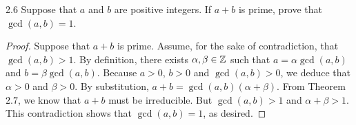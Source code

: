 \begin{exercise}{2.6}
    Suppose that \(a\) and \(b\) are positive integers. If \(a+b\) is prime, prove that \(\gcd(a,b) = 1\).
\end{exercise}
\begin{proof}
    Suppose that \(a + b\) is prime. Assume, for the sake of contradiction, that \(\gcd(a,b) > 1\).
    By definition, there exists \(\alpha, \beta \in \mathbb{Z}\) such that
    \(a = \alpha\gcd(a,b)\) and \(b = \beta\gcd(a,b)\). Because \(a > 0\), \(b > 0\) and \(\gcd(a,b) > 0\), we deduce
    that \(\alpha > 0\) and \(\beta > 0\). By substitution, \(a + b = \gcd(a,b)(\alpha + \beta)\).
    From Theorem \(2.7\), we know that \(a+b\) must be irreducible. But \(\gcd(a,b) > 1\) and \(\alpha + \beta > 1\).
    This contradiction shows that \(\gcd(a,b) = 1\), as desired.
\end{proof}